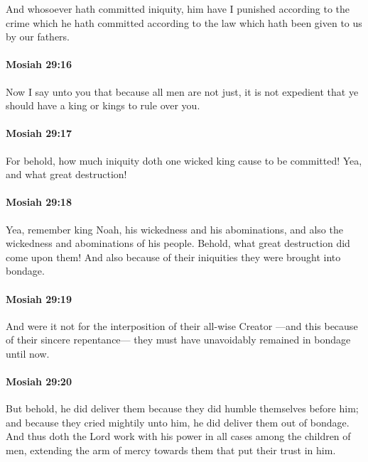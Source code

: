 			And whosoever hath committed iniquity,
			him have I punished according to the crime which he hath committed
			according to the law which hath been given to us by our fathers.

		\paragraph{Mosiah 29:16} %
			\label{MOSIAH-29-16}

			Now I say unto you that because all men are not just,
			it is not expedient that ye should have a king or kings to rule over you.

		\paragraph{Mosiah 29:17} %
			\label{MOSIAH-29-17}

			For behold, how much iniquity doth one wicked king cause to be committed!
			Yea, and what great destruction!

		\paragraph{Mosiah 29:18} %
			\label{MOSIAH-29-18}

			Yea, remember king Noah, his wickedness and his abominations,
			and also the wickedness and abominations of his people.
			Behold, what great destruction did come upon them!
			And also because of their iniquities they were brought into bondage.

		\paragraph{Mosiah 29:19} %
			\label{MOSIAH-29-19}

			And were it not for the interposition of their all-wise Creator
			---and this because of their sincere repentance---
			they must have unavoidably remained in bondage until now.

		\paragraph{Mosiah 29:20} %
			\label{MOSIAH-29-20}

			But behold, he did deliver them
			because they did humble themselves before him;
			and because they cried mightily unto him,
			he did deliver them out of bondage.
			And thus doth the Lord work with his power
			in all cases among the children of men,
			extending the arm of mercy towards them that put their trust in him.

